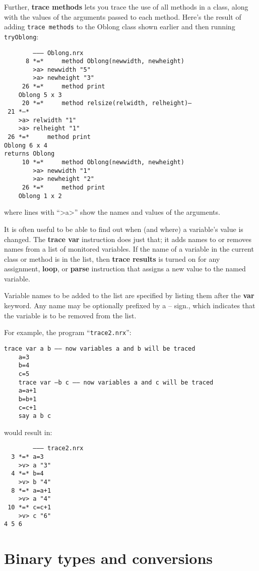 Further, \textbf{trace methods} lets you trace the use of all methods in a
class, along with the values of the arguments passed to each
method. Here’s the result of adding \texttt{trace methods} to the Oblong class
shown earlier and then running \texttt{tryOblong}:
\begin{verbatim}
        ––– Oblong.nrx
      8 *=*     method Oblong(newwidth, newheight)
        >a> newwidth "5"
        >a> newheight "3"
     26 *=*     method print
    Oblong 5 x 3
     20 *=*     method relsize(relwidth, relheight)–
 21 *–*
    >a> relwidth "1"
    >a> relheight "1"
 26 *=*     method print
Oblong 6 x 4
returns Oblong
     10 *=*     method Oblong(newwidth, newheight)
        >a> newwidth "1"
        >a> newheight "2"
     26 *=*     method print
    Oblong 1 x 2
\end{verbatim}
where lines with “>a>” show the names and values of the arguments.

It is often useful to be able to find out when (and where) a variable’s value is changed. The \textbf{trace var} instruction does just that; it adds names to or removes names from a list of monitored variables. If the name of a variable in the current class or method is in the list, then \textbf{trace results} is turned on for any assignment, \textbf{loop}, or \textbf{parse} instruction that assigns a new value to the named variable.

Variable names to be added to the list are specified by listing them after the \textbf{var} keyword. Any name may be optionally prefixed by a – sign., which indicates that the variable is to be removed from the list.

For example, the program “\texttt{trace2.nrx}”:
\begin{lstlisting}[label=trace2,caption=trace2.nrx]
    trace var a b –– now variables a and b will be traced
    a=3
    b=4
    c=5
    trace var –b c –– now variables a and c will be traced
    a=a+1
    b=b+1
    c=c+1
    say a b c
\end{lstlisting}
would result in:
\begin{verbatim}
        ––– trace2.nrx
  3 *=* a=3
    >v> a "3"
  4 *=* b=4
    >v> b "4"
  8 *=* a=a+1
    >v> a "4"
 10 *=* c=c+1
    >v> c "6"
4 5 6
\end{verbatim}

\section{Binary types and conversions}\label{binarith}

